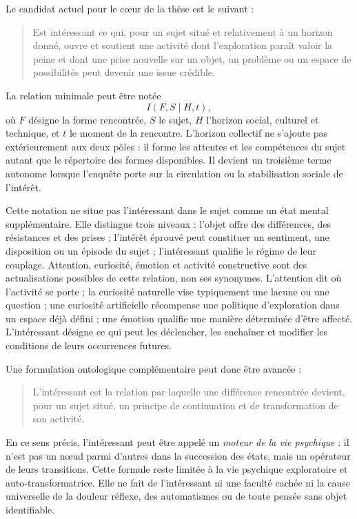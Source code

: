 \documentclass[11pt,a4paper]{article}
\begin{document}
Le candidat actuel pour le cœur de la thèse est le suivant :

\begin{quote}
Est intéressant ce qui, pour un sujet situé et relativement à un horizon donné,
ouvre et soutient une activité dont l'exploration paraît valoir la peine et dont
une prise nouvelle sur un objet, un problème ou un espace de possibilités peut
devenir une issue crédible.
\end{quote}

La relation minimale peut être notée
\[
  I(F,S\mid H,t),
\]
où \(F\) désigne la forme rencontrée, \(S\) le sujet, \(H\) l'horizon social,
culturel et technique, et \(t\) le moment de la rencontre. L'horizon collectif
ne s'ajoute pas extérieurement aux deux pôles : il forme les attentes et les
compétences du sujet autant que le répertoire des formes disponibles. Il devient
un troisième terme autonome lorsque l'enquête porte sur la circulation ou la
stabilisation sociale de l'intérêt.

Cette notation ne situe pas l'intéressant dans le sujet comme un état mental
supplémentaire. Elle distingue trois niveaux : l'objet offre des différences,
des résistances et des prises ; l'intérêt éprouvé peut constituer un sentiment,
une disposition ou un épisode du sujet ; l'intéressant qualifie le régime de
leur couplage. Attention, curiosité, émotion et activité constructive sont des
actualisations possibles de cette relation, non ses synonymes. L'attention dit
où l'activité se porte ; la curiosité naturelle vise typiquement une lacune ou
une question ; une curiosité artificielle récompense une politique
d'exploration dans un espace déjà défini ; une émotion qualifie une manière
déterminée d'être affecté. L'intéressant désigne ce qui peut les déclencher, les
enchaîner et modifier les conditions de leurs occurrences futures.

Une formulation ontologique complémentaire peut donc être avancée :

\begin{quote}
L'intéressant est la relation par laquelle une différence rencontrée devient,
pour un sujet situé, un principe de continuation et de transformation de son
activité.
\end{quote}

En ce sens précis, l'intéressant peut être appelé un \emph{moteur de la vie
psychique} : il n'est pas un nœud parmi d'autres dans la succession des états,
mais un opérateur de leurs transitions. Cette formule reste limitée à la vie
psychique exploratoire et auto-transformatrice. Elle ne fait de l'intéressant ni
une faculté cachée ni la cause universelle de la douleur réflexe, des automatismes
ou de toute pensée sans objet identifiable.
\end{document}
